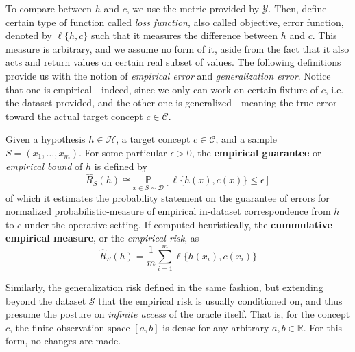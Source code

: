 To compare between $h$ and $c$, we use the metric provided by $\mathcal{Y}$. Then, define certain type of function called \textit{loss function}, also called objective, error function, denoted by $\ell\{h,c\}$ such that it measures the difference between $h$ and $c$. This measure is arbitrary, and we assume no form of it, aside from the fact that it also acts and return values on certain real subset of values. The following definitions provide us with the notion of \textit{empirical error} and \textit{generalization error}. Notice that one is empirical - indeed, since we only can work on certain fixture of $c$, i.e. the dataset provided, and the other one is generalized - meaning the true error toward the actual target concept $c\in\mathcal{C}$. 
\begin{definition} 
    Given a hypothesis $h\in \mathcal{H}$, a target concept $c\in \mathcal{C}$, and a sample $S=(x_{1},\dots,x_{m})$. For some particular $\epsilon>0$, the \textbf{empirical guarantee} or \textit{empirical bound} of $h$ is defined by\begin{equation}
        \hat{R}_{S}(h) \cong \underset{x\in S\sim\mathcal{D}}{\mathbb{P}} [\ell\{h(x),c(x)\}\leq \epsilon]
    \end{equation} 
    of which it estimates the probability statement on the guarantee of errors for normalized probabilistic-measure of empirical in-dataset correspondence from $h$ to $c$ under the operative setting. If computed heuristically, the \textbf{cummulative empirical measure}, or the \textit{empirical risk}, as
    \begin{equation}
        \hat{R}_{S}(h) = \frac{1}{m} \sum_{i=1}^{m} \ell\{h(x_i),c(x_i)\}
    \end{equation}
\end{definition}
Similarly, the generalization risk defined in the same fashion, but extending beyond the dataset $\mathcal{S}$ that the empirical risk is usually conditioned on, and thus presume the posture on \textit{infinite access} of the oracle itself. That is, for the concept $c$, the finite observation space $[a,b]$ is dense for any arbitrary $a,b\in\mathbb{R}$. For this form, no changes are made. 

